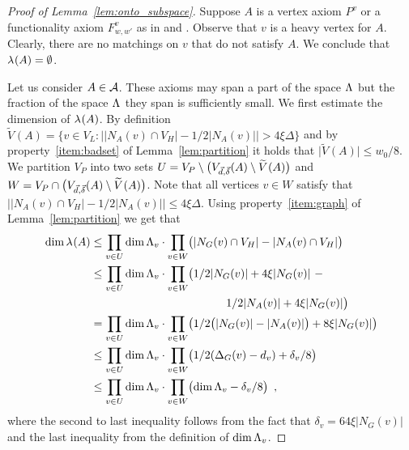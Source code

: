\documentclass{article}
\providecommand{\abs}[1]{\lvert#1\rvert}
\providecommand{\Abs}[1]{\bigl\lvert#1\bigr\rvert}
\newcommand{\set}[1]{\{ #1 \}}
\newcommand{\setdescr}[3][\mid]{\set{ #2 #1 #3 }}
\newcommand{\setsize}[1]{\lvert#1\rvert}
\newcommand{\eqcomma}{\enspace ,}
\newcommand{\reflem}[1]{Lemma~\ref{#1}}
\newcommand{\heavy}{heavy\xspace}
\newcommand{\neigh}[2][]{N_{{#1}}(#2)}
\renewcommand{\deg}[2][XXXXXXXXXXXX]{\Delta_{#1}(#2)}
\newcommand{\diff}{\xi}
\newcommand{\ontocdiff}{64}
\newcommand{\GdegMax}{\Delta}
\newcommand{\V}[1][]{V_{#1}}
\newcommand{\Vl}{\V[L]}
\newcommand{\Vp}{\V[P]}
\newcommand{\Vh}{\V[H]}
\newcommand{\Vbad}[2][]{\widetilde V^{#1}(#2)}
\newcommand{\Ax}{\ensuremath\mathcal{A}}
\newcommand{\thr}[1]{ \ensuremath d_{{#1}} }
\newcommand{\vecthr}{\vec{d}}
\newcommand{\adv}[1]{\delta_{{#1}}}
\newcommand{\vecadv}{\vec{\delta}}
\newcommand{\linspace}[1][]{\ensuremath \Lambda_{{#1}}}
\newcommand{\linmap}[1][]{\ensuremath \lambda_{{#1}}}
\newcommand{\linmapof}[2][]{\linmap[#1](#2)}
\newcommand{\Vthick}[1]{\ensuremath V_{\vecthr,\vecadv}(#1)}
\numberwithin{equation}{section}
\begin{document}
  \begin{proof}[Proof of \reflem{lem:onto_subspace}]
    Suppose $A$ is a vertex axiom $P^v$ 
    or a functionality axiom $F^{v}_{w,w'}$ as in 
    and .
    Observe that $v$ is a \heavy vertex for $A$.
    Clearly, there are no matchings on $v$ that do not
    satisfy $A$. We conclude that $\linmapof{A} = \emptyset$.
  
    Let us consider $A \in \Ax$. 
    These axioms may span a part of the space $\linspace$ but 
    the fraction of the space $\linspace$ they span 
    is sufficiently small. 
    We first estimate the dimension of $\linmapof{A}$.
    By definition $\Vbad{A} = \setdescr[:]{v \in \Vl}{
			\Abs{ \abs{ \neigh[A]{v} \cap \Vh } - 
			1/2\abs{ \neigh[A]{v} } } > 
			4 \diff \GdegMax} $
    and by property~\ref{item:badset} of \reflem{lem:partition}
    it holds that
    $\setsize{\Vbad{A}} \leq w_0/8$. We partition $\Vp$ into two sets 
    $U = \Vp \setminus \bigl( \Vthick{A} \setminus \Vbad{A} \bigr)$ and
    $W = \Vp \cap \bigl( \Vthick{A} \setminus \Vbad{A} \bigr)$.
    Note that all vertices $v \in W$ satisfy that
    $\Abs{ \abs{ \neigh[A]{v} \cap \Vh } - 
			1/2\abs{ \neigh[A]{v} } } \le
			4 \diff \GdegMax$.
    Using property~\ref{item:graph} of \reflem{lem:partition}
    we get that
    \begin{align}
      \dim \linmapof{A} 
      &\le \prod_{v \in U}
      \dim \linspace[v] 
      \cdot \prod_{v \in W} 
      \bigl(\abs{ \neigh[G]{v} \cap \Vh } 
      - \abs{ \neigh[A]{v} \cap \Vh } \bigr)
      \\
      &\le \prod_{v \in U} \dim \linspace[v] 
      \cdot \prod_{v \in W}
      \bigl(
      1/2\abs{ \neigh[G]{v} } + 4 \diff \abs{ \neigh[G]{v} } ~
      -  \nonumber\\
      &\qquad\qquad\qquad\qquad\qquad\qquad
      1/2\abs{ \neigh[A]{v} } + 4 \diff \abs{ \neigh[G]{v} }
      \bigr)
      \\
      &= \prod_{v \in U} \dim \linspace[v] 
      \cdot \prod_{v \in W} 
      \bigl(
      1/2\bigl(\abs{ \neigh[G]{v} } - \abs{ \neigh[A]{v} } \bigr) 
      + 
      8 \diff \abs{ \neigh[G]{v} } 
      \bigr)
      \\
      &\le \prod_{v \in U} \dim \linspace[v] 
      \cdot \prod_{v \in W}  
      \bigl(
      1/2(\deg[G]{v} - \thr{v}) 
      + 
      \adv{v}/8
      \bigr)
      \\
      &\le \prod_{v \in U} \dim \linspace[v] 
      \cdot \prod_{v \in W} 
      \bigl( \dim \linspace[v] - \adv{v}/8 \bigr) \eqcomma
    \end{align}
    where the second to last inequality follows from 
    the fact that $\adv{v} = \ontocdiff \diff \abs{ \neigh[G]{v} } $ 
    and the last inequality from the definition of $\dim \linspace[v]$.
    

\end{proof}
\end{document}
